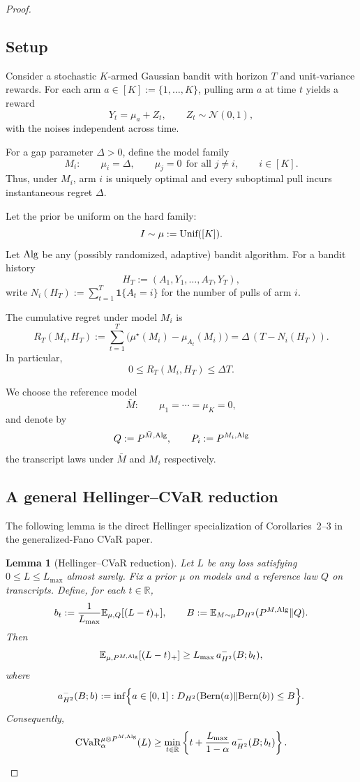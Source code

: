 \documentclass[conference]{IEEEtran}
\newtheorem{lemma}{Lemma}
\begin{document}
\begin{proof}[Proof]
\subsection{Setup}

Consider a stochastic $K$-armed Gaussian bandit with horizon $T$ and unit-variance rewards.
For each arm $a \in [K] := \{1,\dots,K\}$, pulling arm $a$ at time $t$ yields a reward
\[
Y_t = \mu_a + Z_t, \qquad Z_t \sim \mathcal N(0,1),
\]
with the noises independent across time.

For a gap parameter $\Delta>0$, define the model family
\[
M_i : \qquad \mu_i = \Delta,\qquad \mu_j = 0\ \ \text{for all }j\neq i,\qquad i\in[K].
\]
Thus, under $M_i$, arm $i$ is uniquely optimal and every suboptimal pull incurs instantaneous regret $\Delta$.

Let the prior be uniform on the hard family:
\[
I \sim \mu := \textup{Unif}([K]).
\]
Let $\textup{Alg}$ be any (possibly randomized, adaptive) bandit algorithm.
For a bandit history
\[
H_T := (A_1,Y_1,\dots,A_T,Y_T),
\]
write $N_i(H_T) := \sum_{t=1}^T \mathbf 1\{A_t=i\}$ for the number of pulls of arm $i$.

The cumulative regret under model $M_i$ is
\[
R_T(M_i,H_T) := \sum_{t=1}^T \bigl(\mu^\star(M_i)-\mu_{A_t}(M_i)\bigr)
= \Delta\,(T-N_i(H_T)).
\]
In particular,
\[
0\le R_T(M_i,H_T)\le \Delta T.
\]

We choose the reference model
\[
\bar M:\qquad \mu_1=\cdots=\mu_K=0,
\]
and denote by
\[
Q := P^{\bar M,\textup{Alg}},
\qquad
P_i := P^{M_i,\textup{Alg}}
\]
the transcript laws under $\bar M$ and $M_i$ respectively.

\subsection{A general Hellinger--CVaR reduction}

The following lemma is the direct Hellinger specialization of Corollaries~2--3 in the generalized-Fano CVaR paper.

\begin{lemma}[Hellinger--CVaR reduction]
\label{lem:hellinger-cvar-reduction}
Let $L$ be any loss satisfying $0\le L\le L_{\max}$ almost surely.
Fix a prior $\mu$ on models and a reference law $Q$ on transcripts.
Define, for each $t\in\mathbb R$,
\[
b_t := \frac{1}{L_{\max}} \mathbb{E}_{\mu,Q}[(L-t)_+],
\qquad
B := \mathbb{E}_{M\sim\mu} D_{H^2}(P^{M,\textup{Alg}}\|Q).
\]
Then
\[
\mathbb{E}_{\mu,P^{M,\textup{Alg}}}[(L-t)_+]
\ge
L_{\max}\, a^{-}_{H^2}(B;b_t),
\]
where
\[
a^{-}_{H^2}(B;b)
:=
\inf\Bigl\{a\in[0,1]:
D_{H^2}(\textup{Bern}(a)\|\textup{Bern}(b))\le B
\Bigr\}.
\]
Consequently,
\[
\textup{CVaR}_\alpha^{\mu\otimes P^{M,\textup{Alg}}}(L)
\ge
\min_{t\in\mathbb R}
\left\{
t+\frac{L_{\max}}{1-\alpha}\,a^{-}_{H^2}(B;b_t)
\right\}.
\]
\end{lemma}


\end{proof}
\end{document}
